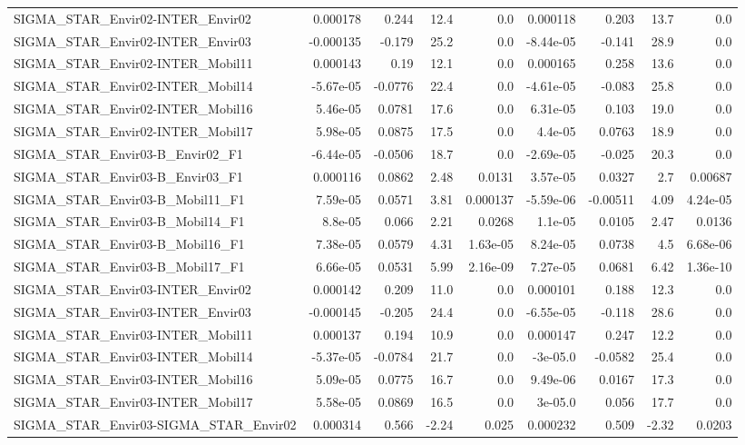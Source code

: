 \begin{tabular}{lrrrrrrrr}
SIGMA_STAR_Envir02-INTER_Envir02 & 0.000178 & 0.244 & 12.4 & 0.0 & 0.000118 & 0.203 & 13.7 & 0.0 \\
SIGMA_STAR_Envir02-INTER_Envir03 & -0.000135 & -0.179 & 25.2 & 0.0 & -8.44e-05 & -0.141 & 28.9 & 0.0 \\
SIGMA_STAR_Envir02-INTER_Mobil11 & 0.000143 & 0.19 & 12.1 & 0.0 & 0.000165 & 0.258 & 13.6 & 0.0 \\
SIGMA_STAR_Envir02-INTER_Mobil14 & -5.67e-05 & -0.0776 & 22.4 & 0.0 & -4.61e-05 & -0.083 & 25.8 & 0.0 \\
SIGMA_STAR_Envir02-INTER_Mobil16 & 5.46e-05 & 0.0781 & 17.6 & 0.0 & 6.31e-05 & 0.103 & 19.0 & 0.0 \\
SIGMA_STAR_Envir02-INTER_Mobil17 & 5.98e-05 & 0.0875 & 17.5 & 0.0 & 4.4e-05 & 0.0763 & 18.9 & 0.0 \\
SIGMA_STAR_Envir03-B_Envir02_F1 & -6.44e-05 & -0.0506 & 18.7 & 0.0 & -2.69e-05 & -0.025 & 20.3 & 0.0 \\
SIGMA_STAR_Envir03-B_Envir03_F1 & 0.000116 & 0.0862 & 2.48 & 0.0131 & 3.57e-05 & 0.0327 & 2.7 & 0.00687 \\
SIGMA_STAR_Envir03-B_Mobil11_F1 & 7.59e-05 & 0.0571 & 3.81 & 0.000137 & -5.59e-06 & -0.00511 & 4.09 & 4.24e-05 \\
SIGMA_STAR_Envir03-B_Mobil14_F1 & 8.8e-05 & 0.066 & 2.21 & 0.0268 & 1.1e-05 & 0.0105 & 2.47 & 0.0136 \\
SIGMA_STAR_Envir03-B_Mobil16_F1 & 7.38e-05 & 0.0579 & 4.31 & 1.63e-05 & 8.24e-05 & 0.0738 & 4.5 & 6.68e-06 \\
SIGMA_STAR_Envir03-B_Mobil17_F1 & 6.66e-05 & 0.0531 & 5.99 & 2.16e-09 & 7.27e-05 & 0.0681 & 6.42 & 1.36e-10 \\
SIGMA_STAR_Envir03-INTER_Envir02 & 0.000142 & 0.209 & 11.0 & 0.0 & 0.000101 & 0.188 & 12.3 & 0.0 \\
SIGMA_STAR_Envir03-INTER_Envir03 & -0.000145 & -0.205 & 24.4 & 0.0 & -6.55e-05 & -0.118 & 28.6 & 0.0 \\
SIGMA_STAR_Envir03-INTER_Mobil11 & 0.000137 & 0.194 & 10.9 & 0.0 & 0.000147 & 0.247 & 12.2 & 0.0 \\
SIGMA_STAR_Envir03-INTER_Mobil14 & -5.37e-05 & -0.0784 & 21.7 & 0.0 & -3e-05.0 & -0.0582 & 25.4 & 0.0 \\
SIGMA_STAR_Envir03-INTER_Mobil16 & 5.09e-05 & 0.0775 & 16.7 & 0.0 & 9.49e-06 & 0.0167 & 17.3 & 0.0 \\
SIGMA_STAR_Envir03-INTER_Mobil17 & 5.58e-05 & 0.0869 & 16.5 & 0.0 & 3e-05.0 & 0.056 & 17.7 & 0.0 \\
SIGMA_STAR_Envir03-SIGMA_STAR_Envir02 & 0.000314 & 0.566 & -2.24 & 0.025 & 0.000232 & 0.509 & -2.32 & 0.0203 \\

\end{tabular}
